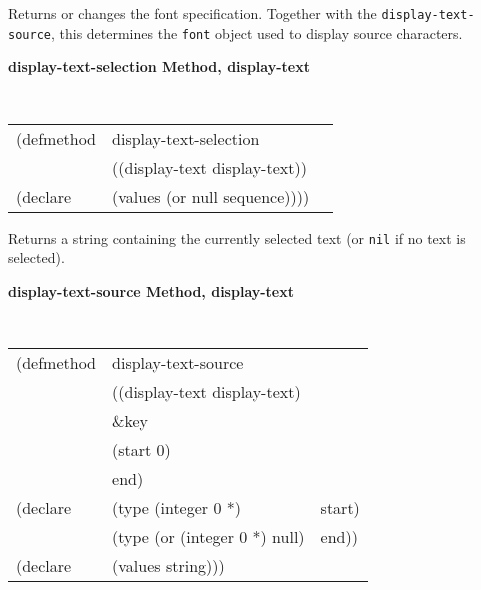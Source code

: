 \begin{flushright} \parbox[t]{6.125in}{
Returns or changes the font specification. Together
with the {\tt display-text-source}, this determines the {\tt font}
object used to display source characters.
} 
\end{flushright}

{\samepage  
{\large {\bf display-text-selection \hfill Method, display-text}}
\begin{flushright} \parbox[t]{6.125in}{
\tt
\begin{tabular}{lll}
\raggedright
(defmethod & display-text-selection & \\
& ((display-text  display-text)) \\
(declare & (values (or null sequence))))
\end{tabular}
\rm

}\end{flushright}}



\begin{flushright} \parbox[t]{6.125in}{
Returns a string containing the currently selected text (or {\tt nil} if no text
is selected).} \end{flushright}


{\samepage  
{\large {\bf display-text-source \hfill Method, display-text}}
\begin{flushright} \parbox[t]{6.125in}{
\tt
\begin{tabular}{lll}
\raggedright
(defmethod & display-text-source & \\
& ((display-text  display-text)\\
&  \&key \\
&   (start 0)\\
&   end) \\
(declare &(type (integer 0 *) & start)\\
         &(type (or (integer 0 *) null) & end))\\
(declare & (values string)))
\end{tabular}
\rm

}\end{flushright}}

